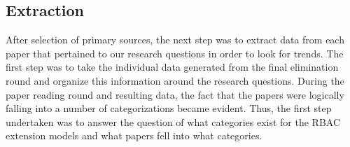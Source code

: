 \subsection{Extraction}

After selection of primary sources, the next step was to extract data from each paper that pertained to our research questions in order to look for trends.  The first step was to take the individual data generated from the final elimination round and organize this information around the research questions.  During the paper reading round and resulting data, the fact that the papers were logically falling into a number of categorizations became evident.  Thus, the first step undertaken was to answer the question of what categories exist for the RBAC extension models and what papers fell into what categories.
